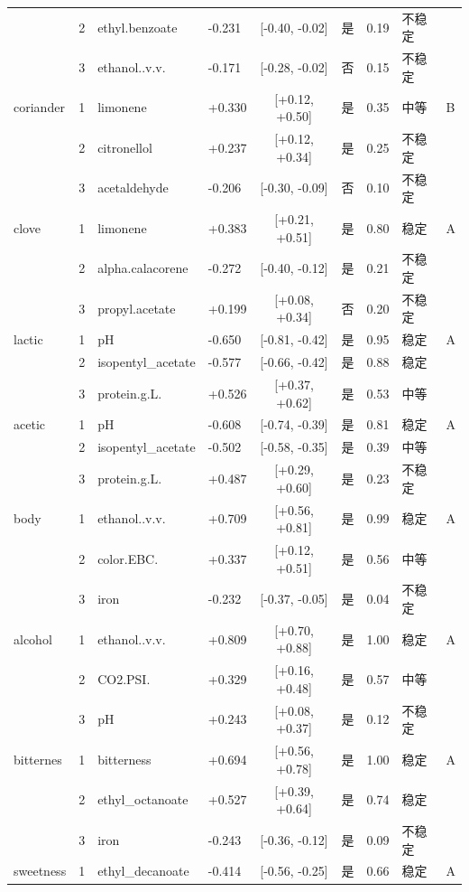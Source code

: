 {\begin{longtable}{llllcccll}
 & 2 & ethyl.benzoate & -0.231 & [-0.40, -0.02] & 是 & 0.19 & 不稳定 &  \\
 & 3 & ethanol..v.v. & -0.171 & [-0.28, -0.02] & 否 & 0.15 & 不稳定 &  \\
coriander & 1 & limonene & +0.330 & [+0.12, +0.50] & 是 & 0.35 & 中等 & B \\
 & 2 & citronellol & +0.237 & [+0.12, +0.34] & 是 & 0.25 & 不稳定 &  \\
 & 3 & acetaldehyde & -0.206 & [-0.30, -0.09] & 否 & 0.10 & 不稳定 &  \\
clove & 1 & limonene & +0.383 & [+0.21, +0.51] & 是 & 0.80 & 稳定 & A \\
 & 2 & alpha.calacorene & -0.272 & [-0.40, -0.12] & 是 & 0.21 & 不稳定 &  \\
 & 3 & propyl.acetate & +0.199 & [+0.08, +0.34] & 否 & 0.20 & 不稳定 &  \\
lactic & 1 & pH & -0.650 & [-0.81, -0.42] & 是 & 0.95 & 稳定 & A \\
 & 2 & isopentyl\_acetate & -0.577 & [-0.66, -0.42] & 是 & 0.88 & 稳定 &  \\
 & 3 & protein.g.L. & +0.526 & [+0.37, +0.62] & 是 & 0.53 & 中等 &  \\
acetic & 1 & pH & -0.608 & [-0.74, -0.39] & 是 & 0.81 & 稳定 & A \\
 & 2 & isopentyl\_acetate & -0.502 & [-0.58, -0.35] & 是 & 0.39 & 中等 &  \\
 & 3 & protein.g.L. & +0.487 & [+0.29, +0.60] & 是 & 0.23 & 不稳定 &  \\
body & 1 & ethanol..v.v. & +0.709 & [+0.56, +0.81] & 是 & 0.99 & 稳定 & A \\
 & 2 & color.EBC. & +0.337 & [+0.12, +0.51] & 是 & 0.56 & 中等 &  \\
 & 3 & iron & -0.232 & [-0.37, -0.05] & 是 & 0.04 & 不稳定 &  \\
alcohol & 1 & ethanol..v.v. & +0.809 & [+0.70, +0.88] & 是 & 1.00 & 稳定 & A \\
 & 2 & CO2.PSI. & +0.329 & [+0.16, +0.48] & 是 & 0.57 & 中等 &  \\
 & 3 & pH & +0.243 & [+0.08, +0.37] & 是 & 0.12 & 不稳定 &  \\
bitternes & 1 & bitterness & +0.694 & [+0.56, +0.78] & 是 & 1.00 & 稳定 & A \\
 & 2 & ethyl\_octanoate & +0.527 & [+0.39, +0.64] & 是 & 0.74 & 稳定 &  \\
 & 3 & iron & -0.243 & [-0.36, -0.12] & 是 & 0.09 & 不稳定 &  \\
sweetness & 1 & ethyl\_decanoate & -0.414 & [-0.56, -0.25] & 是 & 0.66 & 稳定 & A \\

\end{longtable}}
